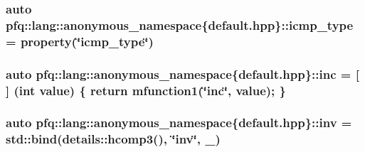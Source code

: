 \hypertarget{namespacepfq_1_1lang_1_1anonymous__namespace_02default_8hpp_03_a0c15abbec8753be8bb160633f697ed4b}{
\subsubsection[{icmp\+\_\+type}]{\setlength{\rightskip}{0pt plus 5cm}auto pfq\+::lang\+::anonymous\+\_\+namespace\{default.\+hpp\}\+::icmp\+\_\+type = {\bf property}(\char`\"{}icmp\+\_\+type\char`\"{})}}\label{namespacepfq_1_1lang_1_1anonymous__namespace_02default_8hpp_03_a0c15abbec8753be8bb160633f697ed4b}
\hypertarget{namespacepfq_1_1lang_1_1anonymous__namespace_02default_8hpp_03_acc7d3a4cca5eb30ff5456e19c613b174}{
\subsubsection[{inc}]{\setlength{\rightskip}{0pt plus 5cm}auto pfq\+::lang\+::anonymous\+\_\+namespace\{default.\+hpp\}\+::inc = \mbox{[}$\,$\mbox{]} (int value) \{ return {\bf mfunction1}(\char`\"{}inc\char`\"{}, value); \}}}\label{namespacepfq_1_1lang_1_1anonymous__namespace_02default_8hpp_03_acc7d3a4cca5eb30ff5456e19c613b174}
\hypertarget{namespacepfq_1_1lang_1_1anonymous__namespace_02default_8hpp_03_a4e7c9b70d87164407c1dd1100ddd8363}{
\subsubsection[{inv}]{\setlength{\rightskip}{0pt plus 5cm}auto pfq\+::lang\+::anonymous\+\_\+namespace\{default.\+hpp\}\+::inv = std\+::bind(details\+::hcomp3(), \char`\"{}inv\char`\"{}, \+\_)}}\label{namespacepfq_1_1lang_1_1anonymous__namespace_02default_8hpp_03_a4e7c9b70d87164407c1dd1100ddd8363}
